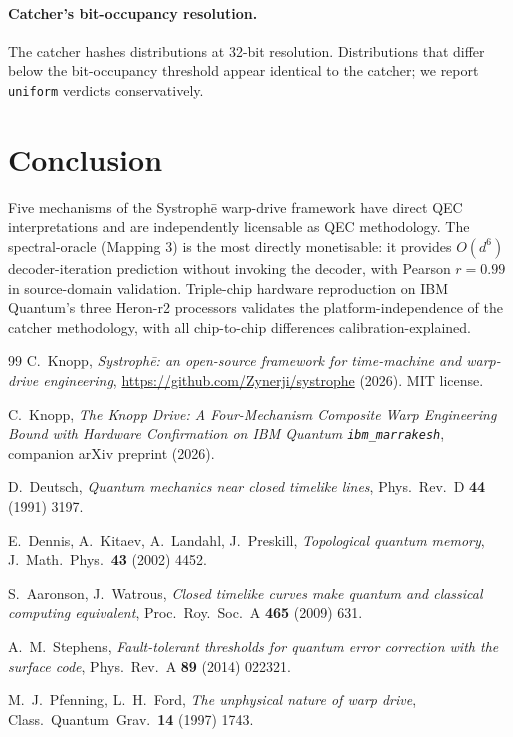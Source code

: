 \documentclass[11pt,a4paper]{article}
\begin{document}
\paragraph{Catcher's bit-occupancy resolution.} The catcher hashes distributions at 32-bit resolution. Distributions that differ below the bit-occupancy threshold appear identical to the catcher; we report \texttt{uniform} verdicts conservatively.

\section{Conclusion}

Five mechanisms of the Systroph\=e warp-drive framework have direct QEC interpretations and are independently licensable as QEC methodology. The spectral-oracle (Mapping 3) is the most directly monetisable: it provides $O(d^{6})$ decoder-iteration prediction without invoking the decoder, with Pearson $r = 0.99$ in source-domain validation. Triple-chip hardware reproduction on IBM Quantum's three Heron-r2 processors validates the platform-independence of the catcher methodology, with all chip-to-chip differences calibration-explained.

\begin{thebibliography}{99}
C.~Knopp, \emph{Systroph\=e: an open-source framework for time-machine and warp-drive engineering}, \url{https://github.com/Zynerji/systrophe} (2026). MIT license.

C.~Knopp, \emph{The Knopp Drive: A Four-Mechanism Composite Warp Engineering Bound with Hardware Confirmation on IBM Quantum \texttt{ibm\_marrakesh}}, companion arXiv preprint (2026).

D.~Deutsch, \emph{Quantum mechanics near closed timelike lines}, Phys.~Rev.~D \textbf{44} (1991) 3197.

E.~Dennis, A.~Kitaev, A.~Landahl, J.~Preskill, \emph{Topological quantum memory}, J.~Math.~Phys.~\textbf{43} (2002) 4452.

S.~Aaronson, J.~Watrous, \emph{Closed timelike curves make quantum and classical computing equivalent}, Proc.~Roy.~Soc.~A \textbf{465} (2009) 631.

A.~M.~Stephens, \emph{Fault-tolerant thresholds for quantum error correction with the surface code}, Phys.~Rev.~A \textbf{89} (2014) 022321.

M.~J.~Pfenning, L.~H.~Ford, \emph{The unphysical nature of warp drive}, Class.~Quantum~Grav.~\textbf{14} (1997) 1743.
\end{thebibliography}
\end{document}
